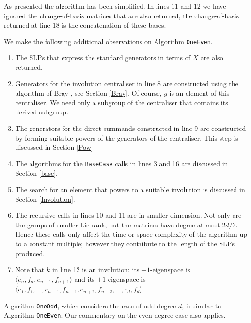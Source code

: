 \documentclass[12pt]{article}
\begin{document}
As presented the algorithm has been simplified. 
In lines 11 and 12 we have ignored
the change-of-basis matrices that are also returned; the change-of-basis 
returned at line 18 is the concatenation of these bases.

We make the following additional observations on Algorithm {\tt OneEven}. 

\begin{enumerate}
\item 
The SLPs that express the standard generators 
in terms of $X$ are also returned.

\item 
Generators for the involution centraliser in line 
8 are constructed using the algorithm of Bray \cite{Bray},
see Section \ref{Bray}. Of course, $g$ is an element of
this centraliser. We need only a subgroup of the centraliser that 
contains its derived subgroup. 

\item 
The generators for the direct summands
constructed in line 9 are constructed by forming suitable powers of
the generators of the centraliser. This step is discussed in
Section \ref{Pow}.

\item 
The algorithms for the {\tt BaseCase} calls in lines 3 and 16 are 
discussed in Section \ref{base}.

\item 
The search for an element that powers to a suitable involution is
discussed in Section \ref{Involution}.

\item 
The recursive calls in lines 10 and 11 are
in smaller dimension. Not only are the groups of
smaller Lie rank, but the matrices have degree at most $2d/3$.
Hence these calls only affect the time or space complexity of the
algorithm up to a constant multiple; however they contribute to the length of
the SLPs produced.

\item 
Note that $k$ in line 12 is an involution: 
its $-1$-eigenspace is $\langle e_n,f_n,e_{n+1},f_{n+1}\rangle$ and its
$+1$-eigenspace is
$\langle e_1,f_1,\ldots, e_{n - 1}, f_{n-1}, e_{n+2},f_{n+2}, \ldots, e_d, f_d \rangle$.
\end{enumerate}
 
Algorithm {\tt OneOdd}, which considers 
the case of odd degree $d$, is similar
to Algorithm {\tt OneEven}.
Our commentary on the even degree case also applies. 
\end{document}
